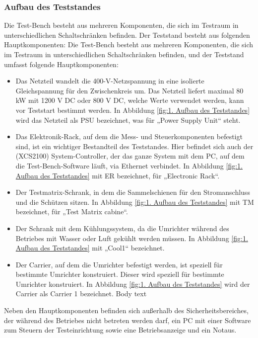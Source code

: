 \subsubsection{Aufbau des Teststandes}
Die Test-Bench besteht aus mehreren Komponenten, die sich im Testraum in unterschiedlichen Schaltschränken befinden.
Der Teststand besteht aus folgenden Hauptkomponenten:
Die Test-Bench besteht aus mehreren Komponenten, die sich im Testraum in unterschiedlichen Schaltschränken befinden, und der Teststand umfasst folgende Hauptkomponenten:
\begin{itemize}

\item Das Netzteil wandelt die 400-V-Netzspannung in eine isolierte Gleichspannung für den Zwischenkreis um.
Das Netzteil liefert maximal 80 kW mit 1200 V DC oder 800 V DC, welche Werte verwendet werden, kann vor Teststart bestimmt werden.
In Abbildung \ref{fig:1. Aufbau des Teststandes} wird das Netzteil als PSU bezeichnet, was für „Power Supply Unit“ steht.
\item Das Elektronik-Rack, auf dem die Mess- und Steuerkomponenten befestigt sind, ist ein wichtiger Bestandteil des Teststandes.
Hier befindet sich auch der (XCS2100) System-Controller, der das ganze System mit dem PC, auf dem die Test-Bench-Software läuft, via Ethernet verbindet.
In Abbildung \ref{fig:1. Aufbau des Teststandes} mit ER bezeichnet, für „Electronic Rack“.
\item Der Testmatrix-Schrank, in dem die Sammelschienen für den Stromanschluss und die Schützen sitzen.
In Abbildung \ref{fig:1. Aufbau des Teststandes} mit TM bezeichnet, für „Test Matrix cabine“.
\item Der Schrank mit dem Kühlungssystem, da die Umrichter während des Betriebes mit Wasser oder Luft gekühlt werden müssen.
In Abbildung \ref{fig:1. Aufbau des Teststandes} mit „Cool1“ bezeichnet.
\item Der Carrier, auf dem die Umrichter befestigt werden, ist speziell für bestimmte Umrichter konstruiert.
Dieser wird speziell für bestimmte Umrichter konstruiert.
In Abbildung \ref{fig:1. Aufbau des Teststandes} wird der Carrier als Carrier 1 bezeichnet.
Body text

\end{itemize}

Neben den Hauptkomponenten befinden sich außerhalb des Sicherheitsbereiches, der während des Betriebes nicht betreten werden darf,
ein PC mit einer Software zum Steuern der Testeinrichtung sowie eine Betriebsanzeige und ein Notaus. \cite*{Main_Manuel_USTB2018}

